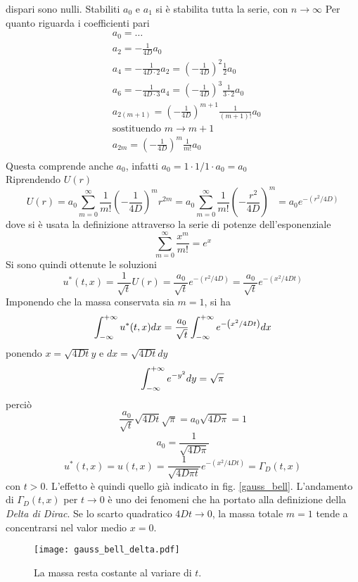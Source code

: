 dispari sono nulli.
Stabiliti $a_0$ e $a_1$ si \`e stabilita tutta la serie, con $n\rightarrow \infty$
Per quanto riguarda i coefficienti pari
\begin{align*}
	& a_0=\ldots \\
	& a_2= - \frac{1}{4D} a_0 \\
	& a_4= - \frac{1}{4D \cdot 2} a_2 = \left( -\frac{1}{4D} \right)^2
	\frac{1}{2} a_0 \\
	& a_6= - \frac{1}{4D \cdot 3} a_4 = \left( -\frac{1}{4D} \right)^3
	\frac{1}{3 \cdot 2} a_0 \\
	& a_{2(m+1)}= \left( -\frac{1}{4D} \right)^{m+1}
	\frac{1}{(m+1)!} a_0 \\
	& \text{sostituendo }m \rightarrow m+1 \\
	& a_{2m}= \left( -\frac{1}{4D} \right)^{m}
	\frac{1}{m!} a_0 \\
\end{align*}
Questa comprende anche $a_0$, infatti $a_0= 1 \cdot 1/1 \cdot a_0= a_0$\\
Riprendendo $U(r)$
\[
	U(r)= a_0 \sum_{m=0}^{\infty} \frac{1}{m!} 
	\left( -\frac{1}{4D} \right)^m r^{2m}
	= a_0 \sum_{m=0}^{\infty} \frac{1}{m!} 
	\left( -\frac{r^2}{4D} \right)^m
	= a_0 e^{- \left( r^2/4D \right)}
\]
dove si \`e usata la definizione attraverso la serie di potenze 
dell'esponenziale
\[
	\sum_{m=0}^{\infty} \frac{x^m}{m!}= e^x
\]
Si sono quindi ottenute le soluzioni
\[
	u^*(t,x)= \frac{1}{\sqrt{t}}U(r)= \frac{a_0}{\sqrt{t}}
	e^{- \left( r^2/4D \right)}
	= \frac{a_0}{\sqrt{t}} e^{- \left( x^2/4Dt \right)}
\]
Imponendo che la massa conservata sia $m=1$, si ha
\[
	\int_{- \infty}^{+ \infty} u^*(t,x) dx= \frac{a_0}{\sqrt{t}}
	\int_{- \infty}^{+ \infty} e^{-\left( x^2/4Dt \right)} dx
\]
ponendo $x= \sqrt{4Dt}y$ e $dx= \sqrt{4Dt} dy$
\[
	\int_{- \infty}^{+ \infty} e^{-y^2}dy= \sqrt{\pi}
\]
perci\`o
\[
	\frac{a_0}{\sqrt{t}}\sqrt{4Dt}\sqrt{\pi}=a_0\sqrt{4D\pi}=1
\]
\[
	a_0= \frac{1}{\sqrt{4D\pi}}
\]
\[
	u^*(t,x)= u(t,x)= \frac{1}{\sqrt{4D\pi t}}
	e^{-\left( x^2/4Dt \right)}
	= \Gamma_D(t,x)
\]
con $t>0$. L'effetto \`e quindi quello gi\`a indicato in fig. \ref{gauss_bell}.
L'andamento di $\Gamma_D(t,x)$ per $t \rightarrow 0$ \`e uno dei fenomeni che
ha portato alla definizione della \textit{Delta di Dirac}.
Se lo scarto quadratico $4Dt \rightarrow 0$, la massa totale $m=1$ tende
a concentrarsi nel valor medio $x=0$.
\begin{figure}[H]
	\centering
	\texttt{[image: gauss\_bell\_delta.pdf]}
	\caption{La massa resta costante al variare di $t$.}
	\label{gauss_bell_delta}
\end{figure}
